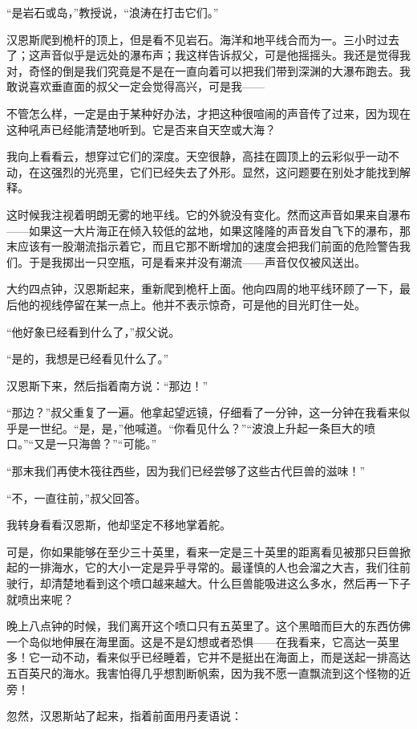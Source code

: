 \documentclass[10pt]{book}
\begin{document}
“是岩石或岛，”教授说，“浪涛在打击它们。”

汉恩斯爬到桅杆的顶上，但是看不见岩石。海洋和地平线合而为一。三小时过去了；这声音似乎是远处的瀑布声；我这样告诉叔父，可是他摇摇头。我还是觉得我对，奇怪的倒是我们究竟是不是在一直向着可以把我们带到深渊的大瀑布跑去。我敢说喜欢垂直面的叔父一定会觉得高兴，可是我——

不管怎么样，一定是由于某种好办法，才把这种很喧闹的声音传了过来，因为现在这种吼声已经能清楚地听到。它是否来自天空或大海？

我向上看看云，想穿过它们的深度。天空很静，高挂在圆顶上的云彩似乎一动不动，在这强烈的光亮里，它们已经失去了外形。显然，这问题要在别处才能找到解释。

这时候我注视着明朗无雾的地平线。它的外貌没有变化。然而这声音如果来自瀑布——如果这一大片海正在倾入较低的盆地，如果这隆隆的声音发自飞下的瀑布，那末应该有一股潮流指示着它，而且它那不断增加的速度会把我们前面的危险警告我们。于是我掷出一只空瓶，可是看来并没有潮流——声音仅仅被风送出。

大约四点钟，汉恩斯起来，重新爬到桅杆上面。他向四周的地平线环顾了一下，最后他的视线停留在某一点上。他并不表示惊奇，可是他的目光盯住一处。

“他好象已经看到什么了，”叔父说。

“是的，我想是已经看见什么了。”

汉恩斯下来，然后指着南方说：“那边！”

“那边？”叔父重复了一遍。他拿起望远镜，仔细看了一分钟，这一分钟在我看来似乎是一世纪。“是，是，”他喊道。“你看见什么？”“波浪上升起一条巨大的喷口。”“又是一只海兽？”“可能。”

“那末我们再使木筏往西些，因为我们已经尝够了这些古代巨兽的滋味！”

“不，一直往前，”叔父回答。

我转身看看汉恩斯，他却坚定不移地掌着舵。

可是，你如果能够在至少三十英里，看来一定是三十英里的距离看见被那只巨兽掀起的一排海水，它的大小一定是异乎寻常的。最谨慎的人也会溜之大吉，我们往前驶行，却清楚地看到这个喷口越来越大。什么巨兽能吸进这么多水，然后再一下子就喷出来呢？

晚上八点钟的时候，我们离开这个喷口只有五英里了。这个黑暗而巨大的东西仿佛一个岛似地伸展在海里面。这是不是幻想或者恐惧——在我看来，它高达一英里多！它一动不动，看来似乎已经睡着，它并不是挺出在海面上，而是送起一排高达五百英尺的海水。我害怕得几乎想割断帆索，因为我不愿一直飘流到这个怪物的近旁！

忽然，汉恩斯站了起来，指着前面用丹麦语说：
\end{document}
